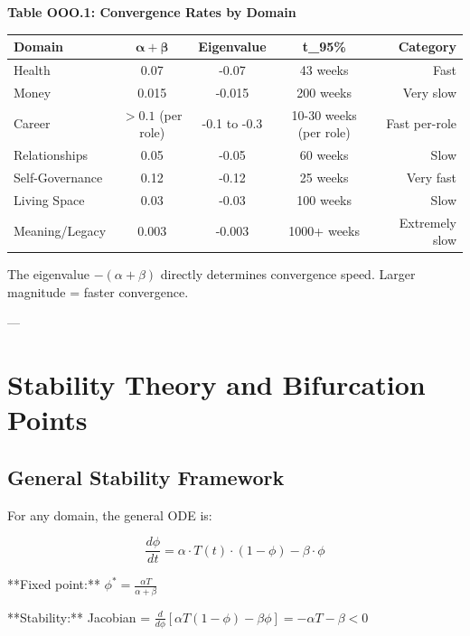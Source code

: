 \textbf{Table OOO.1: Convergence Rates by Domain}

\begin{center}
\small
\begin{tabular}{@{}lcccr@{}}
\toprule
\textbf{Domain} & $\boldsymbol{\alpha + \beta}$ & \textbf{Eigenvalue} & \textbf{t}_{95\%} & \textbf{Category} \\
\midrule
Health & 0.07 & -0.07 & 43 weeks & Fast \\
Money & 0.015 & -0.015 & 200 weeks & Very slow \\
Career & $>0.1$ (per role) & -0.1 to -0.3 & 10-30 weeks (per role) & Fast per-role \\
Relationships & 0.05 & -0.05 & 60 weeks & Slow \\
Self-Governance & 0.12 & -0.12 & 25 weeks & Very fast \\
Living Space & 0.03 & -0.03 & 100 weeks & Slow \\
Meaning/Legacy & 0.003 & -0.003 & 1000+ weeks & Extremely slow \\
\midrule
\end{tabular}
\end{center}

The eigenvalue $-(\alpha + \beta)$ directly determines convergence speed. Larger magnitude = faster convergence.

---


\section{Stability Theory and Bifurcation Points}
\label{ooo:stability}

\subsection{General Stability Framework}

For any domain, the general ODE is:

\begin{equation}
\frac{d\phi}{dt} = \alpha \cdot T(t) \cdot (1 - \phi) - \beta \cdot \phi
\end{equation}

**Fixed point:** $\phi^* = \frac{\alpha T}{\alpha + \beta}$

**Stability:** Jacobian = $\frac{d}{d\phi}[\alpha T(1 - \phi) - \beta \phi] = -\alpha T - \beta < 0$

